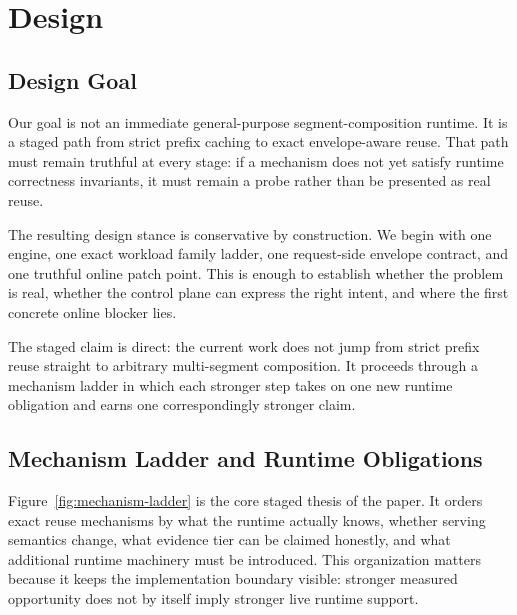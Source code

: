 \documentclass[conference]{IEEEtran}
\begin{document}
\section{Design}

\subsection{Design Goal}

Our goal is not an immediate general-purpose segment-composition runtime. It is a staged path from strict prefix caching to exact envelope-aware reuse. That path must remain truthful at every stage: if a mechanism does not yet satisfy runtime correctness invariants, it must remain a probe rather than be presented as real reuse.

The resulting design stance is conservative by construction. We begin with one engine, one exact workload family ladder, one request-side envelope contract, and one truthful online patch point. This is enough to establish whether the problem is real, whether the control plane can express the right intent, and where the first concrete online blocker lies.

The staged claim is direct: the current work does not jump from strict prefix reuse straight to arbitrary multi-segment composition. It proceeds through a mechanism ladder in which each stronger step takes on one new runtime obligation and earns one correspondingly stronger claim.

\subsection{Mechanism Ladder and Runtime Obligations}

Figure~\ref{fig:mechanism-ladder} is the core staged thesis of the paper. It orders exact reuse mechanisms by what the runtime actually knows, whether serving semantics change, what evidence tier can be claimed honestly, and what additional runtime machinery must be introduced. This organization matters because it keeps the implementation boundary visible: stronger measured opportunity does not by itself imply stronger live runtime support.
\end{document}
